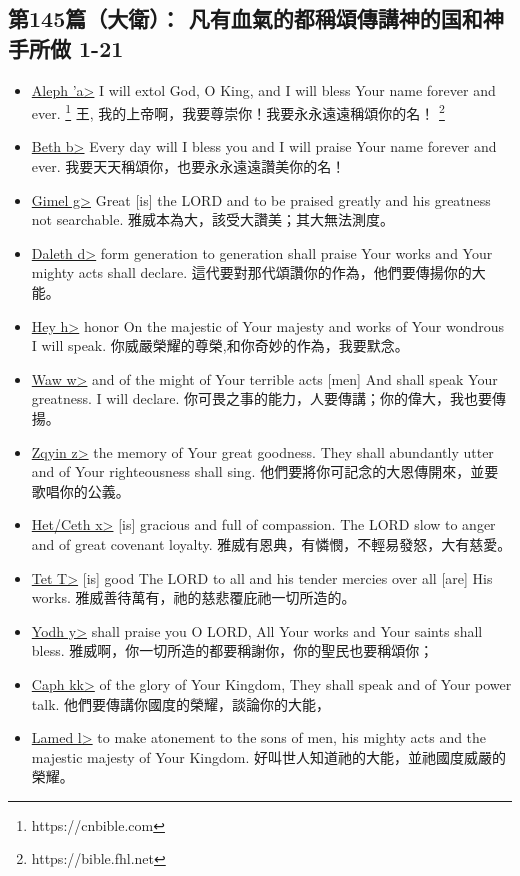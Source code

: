 \subsection{第145篇（大衛）： 凡有血氣的都稱頌傳講神的国和神手所做 1-21}
\begin{itemize}
\itemsep-.45em  
\item \underline{Aleph \<'a>} I will extol God, O King, and I will bless Your name forever and ever. \footnote{https://cnbible.com} 王, 我的上帝啊，我要尊崇你！我要永永遠遠稱頌你的名！ \footnote{https://bible.fhl.net}
\item \underline{Beth \<b>} Every day will I bless you and I will praise Your name forever and ever. 我要天天稱頌你，也要永永遠遠讚美你的名！
\item \underline{Gimel \<g>} Great [is] the LORD and to be praised greatly and his greatness not searchable. 雅威本為大，該受大讚美；其大無法測度。
\item \underline{Daleth \<d>} form generation to generation shall praise Your works and Your mighty acts shall declare. 這代要對那代頌讚你的作為，他們要傳揚你的大能。 
\item \underline{Hey \<h>} honor On the majestic of Your majesty and works of Your wondrous I will speak. 你威嚴榮耀的尊榮,和你奇妙的作為，我要默念。
\item \underline{Waw \<w>} and of the might of Your terrible acts [men] And shall speak Your greatness. I will declare. 你可畏之事的能力，人要傳講；你的偉大，我也要傳揚。
\item \underline{Zqyin  \<z>} the memory of Your great goodness. They shall abundantly utter and of Your righteousness shall sing. 他們要將你可記念的大恩傳開來，並要歌唱你的公義。
\item \underline{Het/Ceth  \<x>} [is] gracious and full of compassion. The LORD slow to anger and of great covenant loyalty. 雅威有恩典，有憐憫，不輕易發怒，大有慈愛。
\item \underline{Tet  \<T>} [is] good The LORD to all and his tender mercies over all [are] His works. 雅威善待萬有，祂的慈悲覆庇祂一切所造的。
\item \underline{Yodh \<y>} shall praise you O LORD, All Your works and Your saints shall bless. 雅威啊，你一切所造的都要稱謝你，你的聖民也要稱頌你；
\item \underline{Caph \<kk>} of the glory of Your Kingdom, They shall speak and of Your power talk. 他們要傳講你國度的榮耀，談論你的大能，
\item \underline{Lamed \<l>} to make atonement to the sons of men, his mighty acts and the majestic majesty of Your Kingdom. 好叫世人知道祂的大能，並祂國度威嚴的榮耀。

\end{itemize}
